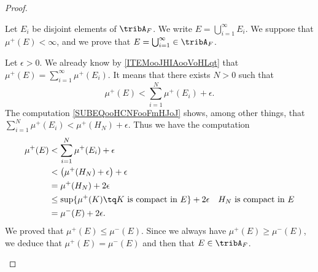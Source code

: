 \begin{proof}
\begin{subproof}
		      \label{ITEMooKVQIooKqHXGO}

		Let \( E_i\) be disjoint elements of \( \tribA_F\). We write \( E=\bigcup_{i=1}^{\infty}E_i\). We suppose that \( \mu^+(E)<\infty\), and we prove that \( E=\bigcup_{i=1}^{\infty}\in \tribA_F\).

		Let \( \epsilon>0\). We already know by \ref{ITEMooJHIAooVoHLqt} that \(  \mu^+(E)=\sum_{i=1}^{\infty}\mu^+(E_i)  \). It means that there exists \( N>0\) such that
		\begin{equation}
			\mu^+(E)<\sum_{i=1}^N\mu^+(E_i)+\epsilon.
		\end{equation}
		The computation \eqref{SUBEQooHCNFooFmHJoJ} shows, among other things, that \( \sum_{i=1}^N\mu^+(E_i)<\mu^+(H_N)+\epsilon\). Thus we have the computation
		\begin{subequations}
			\begin{align}
				\mu^+(E) & <\sum_{i=1}^N\mu^+(E_i)+\epsilon                                                                               \\
				         & <\big( \mu^+(H_N)+\epsilon \big)+\epsilon                                                                      \\
				         & =\mu^+(H_N)+2\epsilon                                                                                          \\
				         & \leq \sup\{ \mu^+(K)\tq \text{\( K\) is compact in \( E\)} \}+2\epsilon & \text{\( H_N\) is compact in \( E\)} \\
				         & =\mu^-(E)+2\epsilon.
			\end{align}
		\end{subequations}
		We proved that \( \mu^+(E)\leq \mu^-(E)\). Since we always have \( \mu^+(E)\geq \mu^-(E)\), we deduce that \( \mu^+(E)=\mu^-(E)\) and then that \( E\in \tribA_F\).

		\spitem[\( \mu^+(V\cup K)=\mu^+(V)+\mu^+(K)\) if \( V\cap K=\emptyset\)]         \label{ITEMooZSUIooPrPhtD}


\end{subproof}
\end{proof}
